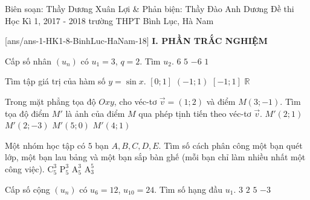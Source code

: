 	\begin{name}
		{Biên soạn: Thầy Dương Xuân Lợi \& Phản biện: Thầy Đào Anh Dương}
		{Đề thi Học Kì 1, 2017 - 2018 trường THPT Bình Lục, Hà Nam}
	\end{name}
	\setcounter{ex}{0}\setcounter{bt}{0}
	[ans/ans-1-HK1-8-BinhLuc-HaNam-18]
\noindent\textbf{I. PHẦN TRẮC NGHIỆM}
\begin{ex}%
	Cấp số nhân $\left(u_n\right)$ có $u_1=3$, $q=2$. Tìm $u_2$.
	\choice
	{\True $6$}
	{$5$}
	{$-6$}
	{$1$}
\end{ex}

\begin{ex}%
	Tìm tập giá trị của hàm số $y=\sin x$.
	\choice
	{$\left[0;1\right]$}
	{$\left(-1;1\right)$}
	{\True $\left[-1;1\right]$}
	{$\mathbb{R}$}
\end{ex}

\begin{ex}%
	Trong mặt phẳng tọa độ $Oxy$, cho véc-tơ $\overrightarrow{v}=(1;2)$ và điểm $M(3;-1)$. Tìm tọa độ điểm $M'$ là ảnh của điểm $M$ qua phép tịnh tiến theo véc-tơ $\overrightarrow{v}$.
	\choice
	{$M'(2;1)$}
	{$M'(2;-3)$}
	{$M'(5;0)$}
	{\True $M'(4;1)$}
\end{ex}

\begin{ex}%
	Một nhóm học tập có $5$ bạn $A,B,C,D,E$. Tìm số cách phân công một bạn quét lớp, một bạn lau bảng và một bạn sắp bàn ghế (mỗi bạn chỉ làm nhiều nhất một công việc).
	\choice
	{$\mathrm{C}_5^3$}
	{$\mathrm{P}_5^3$}
	{\True $\mathrm{A}_5^3$}
	{$\mathrm{A}_3^5$}
\end{ex}

\begin{ex}%
	Cấp số cộng $\left(u_n\right)$ có $u_6=12$, $u_{10}=24$. Tìm số hạng đầu $u_1$.
	\choice
	{$3$}
	{$2$}
	{$5$}
	{\True $-3$}
\end{ex}

